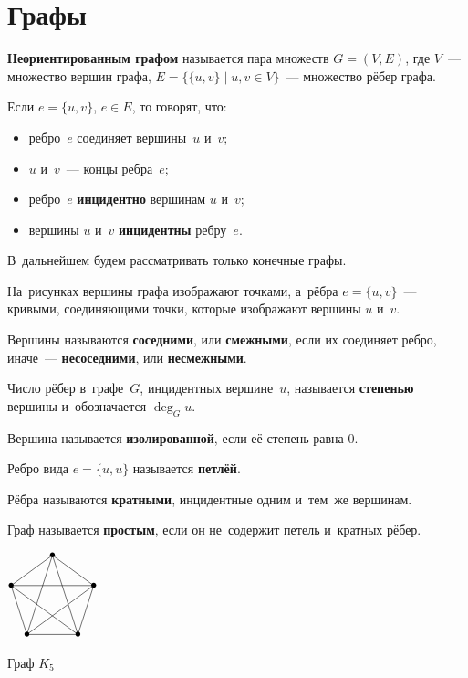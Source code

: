 \section{Графы}
\textbf{Неориентированным графом} называется пара множеств $G = (V, E)$, где $V$~--- множество вершин графа, $E = \{ \{ u, v \} \mid u, v \in V \}$~--- множество рёбер графа.

Если $e = \{ u, v \}$, $e \in E$, то говорят, что:
\begin{itemize}
	\item ребро~$e$ соединяет вершины~$u$ и~$v$;
	\item $u$ и~$v$~--- концы ребра~$e$;
	\item ребро~$e$ \textbf{инцидентно} вершинам $u$ и~$v$;
	\item вершины $u$ и~$v$ \textbf{инцидентны} ребру~$e$.
\end{itemize}

В~дальнейшем будем рассматривать только конечные графы.

На~рисунках вершины графа изображают точками, а~рёбра $e = \{ u, v \}$~--- кривыми, соединяющими точки, которые изображают вершины $u$ и~$v$.

Вершины называются \textbf{соседними}, или \textbf{смежными}, если их соединяет ребро, иначе~--- \textbf{несоседними}, или \textbf{несмежными}.

Число рёбер в~графе~$G$, инцидентных вершине~$u$, называется \textbf{степенью} вершины и~обозначается $\deg_G u$.

Вершина называется \textbf{изолированной}, если её степень равна $0$.

Ребро вида $e = \{ u, u \}$ называется \textbf{петлёй}.

Рёбра называются \textbf{кратными}, инцидентные одним и~тем~же вершинам.

Граф называется \textbf{простым}, если он не~содержит петель и~кратных рёбер.

\begin{floatingfigure}{30mm}
\noindent
\begin{center}
$\begin{xy} /r0.4mm/:
(30, 60) = "1" *{\bullet}; %
(58.532, 39.271) = "2" *{\bullet}; %
(47.634, 5.729) = "3" *{\bullet}; %
(12.366, 5.729) = "4" *{\bullet}; %
(1.468, 39.271) = "5" *{\bullet}; %
"5"; "1" **@{-}; "2" **@{-}; "3" **@{-}; "4" **@{-}; "5" **@{-};
"2" **@{-}; "4" **@{-}; "1" **@{-}; "3" **@{-}; "5" **@{-};
\end{xy}$
\caption{Граф $K_5$}
\end{center}
\end{floatingfigure}

